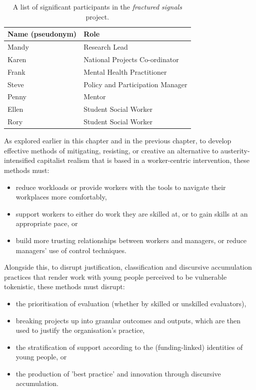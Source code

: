 \begin{table}[]
\centering
\begin{tabular}{|l|l|} \hline 
\textbf{Name (pseudonym)} & \textbf{Role}                    \\ \hline 
Mandy                     & Research Lead                    \\ \hline 
Karen                     & National Projects Co-ordinator   \\ \hline 
Frank                     & Mental Health Practitioner       \\ \hline 
Steve                     & Policy and Participation Manager \\ \hline 
Penny                     & Mentor                           \\ \hline 
Ellen                     & Student Social Worker            \\ \hline 
Rory                      & Student Social Worker           
 \\ \hline\end{tabular}

\caption{A list of significant participants in the \emph{fractured signals} project.}
\label{tab:fs-participants}
\end{table}
As explored earlier in this chapter and in the previous chapter, to develop effective methods of mitigating, resisting, or creative an alternative to austerity-intensified capitalist realism that is based in a worker-centric intervention, these methods must:
\begin{itemize}
\item reduce workloads or provide workers with the tools to navigate their workplaces more comfortably,
\item support workers to either do work they are skilled at, or to gain skills at an appropriate pace, or
\item build more trusting relationships between workers and managers, or reduce managers' use of control techniques.
\end{itemize}
Alongside this, to disrupt justification, classification and discursive accumulation practices that render work with young people perceived to be vulnerable tokenistic, these methods must disrupt:
\begin{itemize}
    \item  the prioritisation of evaluation (whether by skilled or unskilled evaluators),
    \item breaking projects up into granular outcomes and outputs, which are then used to justify the organisation's practice,
    \item  the stratification of support according to the (funding-linked) identities of young people, or
    \item  the production of 'best practice' and innovation through discursive accumulation.
\end{itemize}
